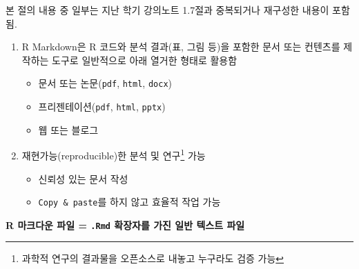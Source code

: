 \documentclass[
  11pt,
]{krantz}
\makeatletter
\providecommand{\tightlist}{%
  \setlength{\itemsep}{0pt}\setlength{\parskip}{0pt}}
\newenvironment{kframe}{%
\medskip{}
\setlength{\fboxsep}{.8em}
 \def\at@end@of@kframe{}%
 \ifinner\ifhmode%
  \def\at@end@of@kframe{\end{minipage}}%
  \begin{minipage}{\columnwidth}%
 \fi\fi%
 \def\FrameCommand##1{\hskip\@totalleftmargin \hskip-\fboxsep
 \colorbox{shadecolor}{##1}\hskip-\fboxsep
     \hskip-\linewidth \hskip-\@totalleftmargin \hskip\columnwidth}%
 \MakeFramed {\advance\hsize-\width
   \@totalleftmargin\z@ \linewidth\hsize
   \@setminipage}}%
 {\par\unskip\endMakeFramed%
 \at@end@of@kframe}
\newenvironment{rmdblock}[1]
  {
  \begin{itemize}
  \renewcommand{\labelitemi}{
    \raisebox{-.7\height}[0pt][0pt]{
      {\setkeys{Gin}{width=3em,keepaspectratio}\texttt{[image: images/\#1]}}
    }
  }
  \setlength{\fboxsep}{1em}
  \begin{kframe}
  \item
  }
  {
  \end{kframe}
  \end{itemize}
  }
\newenvironment{rmdnote}
  {\begin{rmdblock}{note}}
  {\end{rmdblock}}
\renewenvironment{quote}{\begin{kframe}}{\end{kframe}}
\makeatother
\begin{document}
\footnotesize

\begin{rmdnote}
본 절의 내용 중 일부는 지난 학기 강의노트 1.7절과 중복되거나 재구성한 내용이 포함됨.
\end{rmdnote}

\normalsize

\begin{enumerate}
\def\labelenumi{\arabic{enumi}.}
\tightlist
\item
  R Markdown은 R 코드와 분석 결과(표, 그림 등)을 포함한 문서 또는 컨텐츠를 제작하는 도구로 일반적으로 아래 열거한 형태로 활용함

  \begin{itemize}
  \tightlist
  \item
    문서 또는 논문(\texttt{pdf}, \texttt{html}, \texttt{docx})
  \item
    프리젠테이션(\texttt{pdf}, \texttt{html}, \texttt{pptx})
  \item
    웹 또는 블로그
  \end{itemize}
\item
  재현가능(reproducible)한 분석 및 연구\footnote{과학적 연구의 결과물을 오픈소스로 내놓고 누구라도 검증 가능} 가능

  \begin{itemize}
  \tightlist
  \item
    신뢰성 있는 문서 작성
  \item
    \texttt{Copy\ \&\ paste}를 하지 않고 효율적 작업 가능
  \end{itemize}
\end{enumerate}

\begin{quote}
\textbf{R 마크다운 파일 = \texttt{.Rmd} 확장자를 가진 일반 텍스트 파일}
\end{quote}
\end{document}
